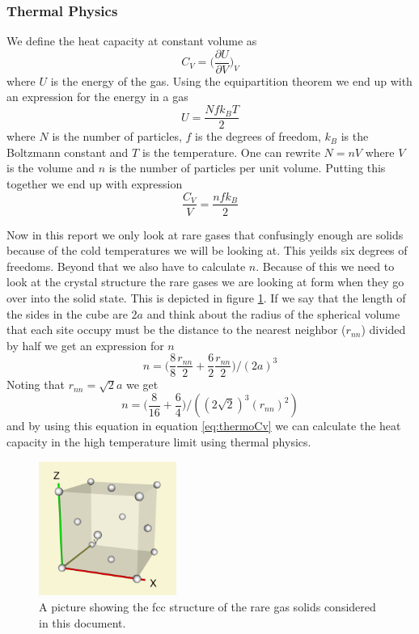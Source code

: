 \documentclass[11pt]{article}
\begin{document}
\subsubsection{Thermal Physics}
We define the heat capacity at constant volume as
\begin{equation}
	C_V = \Big(\frac{\partial U}{\partial V}\Big)_V
\end{equation}
where $U$ is the energy of the gas. Using the equipartition theorem we end up with an expression for the energy in a gas\cite{bib:thermo}
\begin{equation}
	U = \frac{Nfk_BT}{2}
\end{equation}
where $N$ is the number of particles, $f$ is the degrees of freedom, $k_B$ is the Boltzmann constant and $T$ is the temperature.  One can rewrite $N = nV$ where $V$ is the volume and $n$ is the number of particles per unit volume. Putting this together we end up with expression
\begin{equation}
	\frac{C_V}{V} = \frac{nfk_B}{2}
	\label{eq:thermoCv}
\end{equation}

Now in this report we only look at rare gases that confusingly enough are solids because of the cold temperatures we will be looking at. This yeilds six degrees of freedoms. Beyond that we also have to calculate $n$. Because of this we need to look at the crystal structure the rare gases we are looking at form when they go over into the solid state. This is depicted in figure \ref{fig:fcc}. If we say that the length of the sides in the cube are 2$a$  and think about the radius of the spherical volume that each site occupy must be the distance to the nearest neighbor ($r_{nn}$) divided by half we get an expression for $n$
\begin{equation}
	n = \Big(\frac{8}{8}\frac{r_{nn}}{2} + \frac{6}{2}\frac{r_{nn}}{2}\Big)/(2a)^3
\end{equation}
Noting that $r_{nn} = \sqrt{2}a$ we get
\begin{equation}
	n = \Big(\frac{8}{16} + \frac{6}{4}\Big)/((2\sqrt{2})^3(r_{nn})^2)
	\label{eq:n}
\end{equation}
and by using this equation in equation \ref{eq:thermoCv} we can calculate the heat capacity in the high temperature limit using thermal physics. 
\begin{figure}[H]
	\centering
	\includegraphics[width=0.4\textwidth]{fcc.png}
	\caption{A picture showing the fcc structure of the rare gas solids considered in this document.}
	\label{fig:fcc}
\end{figure}
\end{document}
